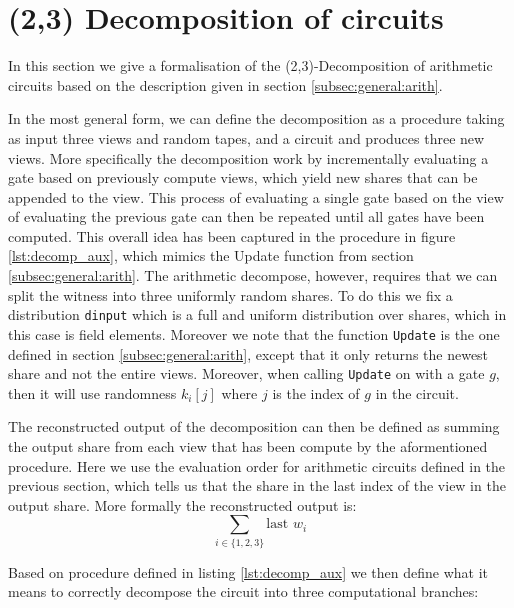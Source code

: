 \section{(2,3) Decomposition of circuits}
\label{sec:decomposition}
In this section we give a formalisation of the (2,3)-Decomposition of arithmetic
circuits based on the description given in section \ref{subsec:general:arith}.

In the most general form, we can define the decomposition as a procedure taking
as input three views and random tapes, and a circuit and produces three new
views.
More specifically the decomposition work by incrementally evaluating a gate based on
previously compute views, which yield new shares that can be appended to the
view. This process of evaluating a single gate based on the view of evaluating
the previous gate can then be repeated until all gates have been computed. This
overall idea has been captured in the procedure in figure \ref{lst:decomp_aux},
which mimics the Update function from section \ref{subsec:general:arith}.
The arithmetic decompose, however, requires that we can split the witness into
three uniformly random shares. To do this we fix a distribution \texttt{dinput}
which is a full and uniform distribution over shares, which in this case is
field elements.
Moreover we note that the function \texttt{Update} is the one defined in section
\ref{subsec:general:arith}, except that it only returns the newest share and not
the entire views. Moreover, when calling \texttt{Update} on with a gate $g$,
then it will use randomness $k_{i}[j]$ where $j$ is the index of $g$ in the circuit.

The reconstructed output of the decomposition can then be defined as summing the output share
from each view that has been compute by the aformentioned procedure. Here we use
the evaluation order for arithmetic circuits defined in the previous section,
which tells us that the share in the last index of the view in the output share.
More formally the reconstructed output is:
\begin{equation}
  \sum_{i \in \{1,2,3\}} \text{last } w_{i}
\end{equation}

Based on procedure defined in listing \ref{lst:decomp_aux} we then define what
it means to correctly decompose the circuit into three computational branches:

